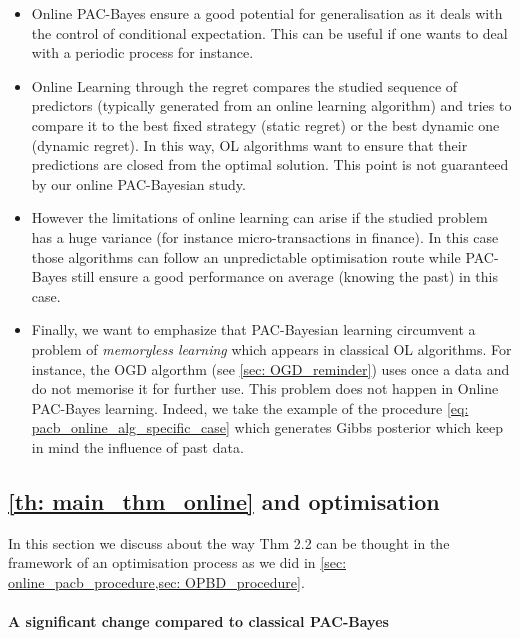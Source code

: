 \begin{itemize}
  \item Online PAC-Bayes ensure a good potential for generalisation as it deals with the control of conditional expectation. This can be useful if one wants to deal with a periodic process for instance.
  \item Online Learning through the regret compares the studied sequence of predictors (typically generated from an online learning algorithm) and tries to compare it to the best fixed strategy (static regret) or the best dynamic one (dynamic regret). In this way, OL algorithms want to ensure that their predictions are closed from the optimal solution. This point is not guaranteed by our online PAC-Bayesian study.
  \item However the limitations of online learning can arise if the studied problem has a huge variance (for instance micro-transactions in finance). In this case those algorithms can follow an unpredictable optimisation route while PAC-Bayes still ensure a good performance on average (knowing the past) in this case.
  \item Finally, we want to emphasize that PAC-Bayesian learning circumvent a problem of \emph{memoryless learning} which appears in classical OL algorithms. For instance, the OGD algorthm (see \cref{sec: OGD_reminder}) uses once a data and do not memorise it for further use. This problem does not happen in Online PAC-Bayes learning. Indeed, we take the example of the procedure \cref{eq: pacb_online_alg_specific_case} which generates Gibbs posterior which keep in mind the influence of past data.
\end{itemize}






\subsection{\cref{th: main_thm_online} and optimisation}
\label{sec: main_thm_and_optim}

In this section we discuss about the way Thm 2.2 can be thought in the framework of an optimisation process as we did in \cref{sec: online_pacb_procedure,sec: OPBD_procedure}.

\paragraph{A significant change compared to classical PAC-Bayes}

